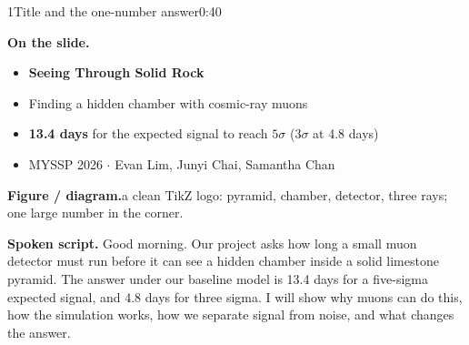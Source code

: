 \documentclass[11pt,a4paper]{article}
\newcommand{\onslide}{\par\smallskip\noindent\textbf{On the slide.}\;}
\newcommand{\figlabel}{\par\smallskip\noindent\textbf{Figure / diagram.}\;}
\newcommand{\spoken}{\par\smallskip\noindent\textbf{Spoken script.}\;}
\begin{document}
\begin{slidebox}{1}{Title and the one-number answer}{0:40}
\onslide
\begin{itemize}
  \item \textbf{Seeing Through Solid Rock}
  \item Finding a hidden chamber with cosmic-ray muons
  \item \textbf{13.4 days} for the expected signal to reach $5\sigma$
        ($3\sigma$ at 4.8 days)
  \item MYSSP 2026 $\cdot$ Evan Lim, Junyi Chai, Samantha Chan
\end{itemize}
\figlabel a clean TikZ logo: pyramid, chamber, detector, three rays; one large
number in the corner.
\begin{center}
\end{center}
\spoken
Good morning. Our project asks how long a small muon detector must run before
it can see a hidden chamber inside a solid limestone pyramid. The answer under
our baseline model is 13.4 days for a five-sigma expected signal, and 4.8 days
for three sigma. I will show why muons can do this, how the simulation works,
how we separate signal from noise, and what changes the answer.
\end{slidebox}
\end{document}
